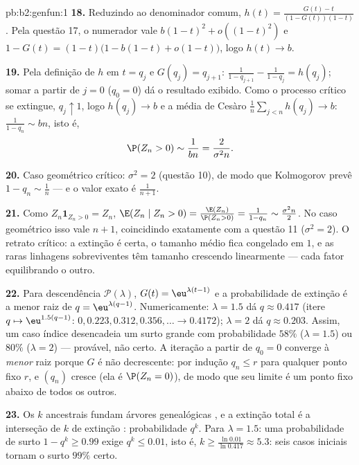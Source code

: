 \begin{solution}{pb:b2:genfun:1}
\textbf{18.} Reduzindo ao denominador comum, $h(t) =
\frac{G(t) - t}{(1 - G(t))(1 - t)}$. Pela questão 17, o
numerador vale $b(1-t)^2 + o((1-t)^2)$ e $1 - G(t) = (1 -
t)\bigl(1 - b(1-t) + o(1-t)\bigr)$, logo $h(t) \to b$.

\textbf{19.} Pela definição de $h$ em $t = q_j$ e $G(q_j) =
q_{j+1}$: $\frac1{1 - q_{j+1}} - \frac1{1-q_j} = h(q_j)$;
somar a partir de $j = 0$ ($q_0 = 0$) dá o resultado exibido. Como o
processo crítico se extingue, $q_j \uparrow 1$, logo $h(q_j) \to
b$ e a média de Cesàro $\frac1n\sum_{j<n}h(q_j) \to b$:
$\frac1{1-q_n} \sim bn$, isto é,
\[
\P(Z_n > 0) \sim \frac1{bn} = \frac{2}{\sigma^2 n} .
\]

\textbf{20.} Caso geométrico crítico: $\sigma^2 = 2$
(questão 10), de modo que Kolmogorov prevê $1 - q_n \sim \frac1n$
--- e o valor exato é $\frac1{n+1}$.

\textbf{21.} Como $Z_n\mathbf 1_{Z_n > 0} = Z_n$, $\E(Z_n
\mid Z_n > 0) = \frac{\E(Z_n)}{\P(Z_n > 0)} = \frac1{1 -
q_n} \sim \frac{\sigma^2n}2$. No caso geométrico isso vale
$n + 1$, coincidindo exatamente com a questão 11 ($\sigma^2 = 2$). O
retrato crítico: a extinção é certa, o tamanho médio fica
congelado em $1$, e as raras linhagens sobreviventes têm tamanho crescendo
linearmente --- cada fator equilibrando o outro.

\textbf{22.} Para descendência $\mathcal P(\lambda)$, $G(t) =
\eu^{\lambda(t-1)}$ e a probabilidade de extinção é a
menor raiz de $q = \eu^{\lambda(q-1)}$. Numericamente:
$\lambda = 1.5$ dá $q \approx 0.417$ (itere $q \mapsto
\eu^{1.5(q-1)}$: $0, 0.223, 0.312, 0.356, \dots \to 0.4172$);
$\lambda = 2$ dá $q \approx 0.203$. Assim, um caso índice
desencadeia um surto grande com probabilidade $58\%$
($\lambda = 1.5$) ou $80\%$ ($\lambda = 2$) --- provável, não
certo. A iteração a partir de $q_0 = 0$ converge à
\emph{menor} raiz porque $G$ é não decrescente: por
indução $q_n \leq r$ para qualquer ponto fixo $r$, e $(q_n)$
cresce (ela é $\P(Z_n = 0)$), de modo que seu limite é um ponto
fixo abaixo de todos os outros.

\textbf{23.} Os $k$ ancestrais fundam árvores genealógicas
, e a extinção total é a interseção de $k$
 de extinção : probabilidade $q^k$. Para
$\lambda = 1.5$: uma probabilidade de surto $1 - q^k \geq 0.99$
exige $q^k \leq 0.01$, isto é, $k \geq
\frac{\ln 0.01}{\ln 0.417} \approx 5.3$: seis casos iniciais
tornam o surto $99\%$ certo.


\end{solution}
